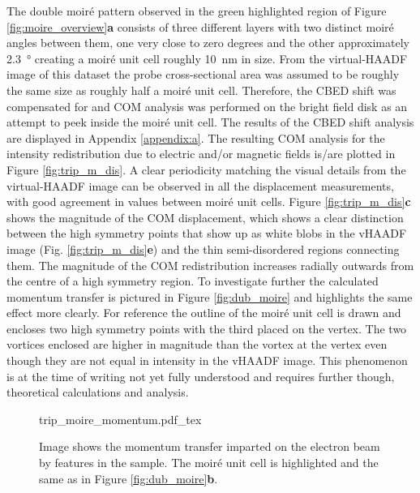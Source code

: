 The double moiré pattern observed in the green highlighted region of Figure \ref{fig:moire_overview}\textbf{a} consists of three different layers with two distinct moiré angles between them, one very close to zero degrees and the other approximately \SI{2.3}{\degree} creating a moiré unit cell roughly \SI{10}{\nano\meter} in size. From the virtual-HAADF image of this dataset the probe cross-sectional area was assumed to be roughly the same size as roughly half a moiré unit cell. Therefore, the CBED shift was compensated for and COM analysis was performed on the bright field disk as an attempt to peek inside the moiré unit cell. The results of the CBED shift analysis are displayed in Appendix \ref{appendix:a}.
The resulting COM analysis for the intensity redistribution due to electric and/or magnetic fields is/are plotted in Figure \ref{fig:trip_m_dis}. A clear periodicity matching the visual details from the virtual-HAADF image can be observed in all the displacement measurements, with good agreement in values between moiré unit cells. Figure \ref{fig:trip_m_dis}\textbf{c} shows the magnitude of the COM displacement, which shows a clear distinction between the high symmetry points that show up as white blobs in the vHAADF image (Fig. \ref{fig:trip_m_dis}\textbf{e}) and the thin semi-disordered regions connecting them. The magnitude of the COM redistribution increases radially outwards from the centre of a high symmetry region. To investigate further the calculated momentum transfer is pictured in Figure \ref{fig:dub_moire} and highlights the same effect more clearly. For reference the outline of the moiré unit cell is drawn and encloses two high symmetry points with the third placed on the vertex. The two vortices enclosed are higher in magnitude than the vortex at the vertex even though they are not equal in intensity in the vHAADF image. This phenomenon is at the time of writing not yet fully understood and requires further though, theoretical calculations and analysis.


\begin{figure}
    \centering
    \def\svgwidth{.9\linewidth}
    {trip_moire_momentum.pdf_tex}
    \caption{Image shows the momentum transfer imparted on the electron beam by features in the sample. The moiré unit cell is highlighted and the same as in Figure \ref{fig:dub_moire}\textbf{b}.}
    \label{fig:trip_m_mom}
\end{figure}

